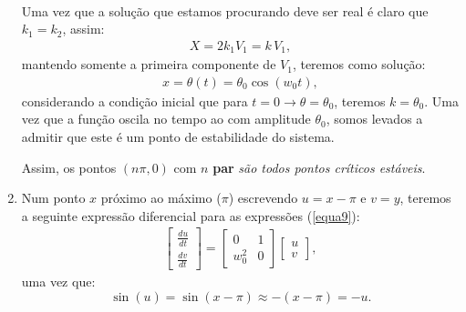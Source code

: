 \documentclass[12pt,openright,twoside,english,brazil]{abntex2}
\begin{document}
\begin{enumerate}[label=\alph*)]
\begin{eqnarray}
\end{eqnarray}
Uma vez que a solução que estamos procurando deve ser real é claro que $k_1=k_2$, assim:
\begin{eqnarray}
 X = 2k_1 V_1 = k\, V_1,
\end{eqnarray}
mantendo somente a primeira componente de $V_1$, teremos como solução:
\begin{eqnarray}
 \boxed{x = \theta (t) = \theta_0 \cos{(w_0t)}},
 \label{equa18}
\end{eqnarray}
considerando a condição inicial que para $t=0 \rightarrow \theta = \theta_0$, teremos $k = \theta_0$. Uma vez que a função oscila no tempo ao com amplitude $\theta_0$, somos levados a admitir que este é um ponto de estabilidade do sistema.

Assim, os pontos $(n\pi,0)$ com $n$ \textbf{par} \textit{são todos pontos críticos estáveis}.

\item Num ponto $x$ próximo ao máximo ($\pi$) escrevendo $u=x-\pi$ e $v=y$, teremos a seguinte expressão diferencial para as expressões (\ref{equa9}):
\begin{eqnarray}
 \begin{bmatrix}
 \frac{du}{dt} \\
 \frac{dv}{dt}
 \end{bmatrix}
 = \begin{bmatrix}
    0 & 1 \\
    w_0^2 & 0
   \end{bmatrix}
   \begin{bmatrix}
    u \\
    v
   \end{bmatrix},
\end{eqnarray}
uma vez que:
\begin{equation}
 \sin{(u)}=\sin{(x-\pi)}\approx -(x-\pi) = -u. \nonumber
\end{equation}


\end{enumerate}
\end{document}
